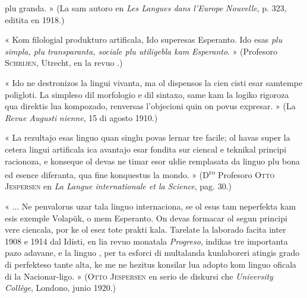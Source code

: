 \begin{VUpage}[237]{}
\vspace*{-9.0mm}
\VUpageSerre{8.26pt}{7.95pt}

\VUcontinue
plu granda. » (La sam autoro en \textit{Les Langues dans l'Europe}\nl
\textit{Nouvelle}, p. 323, editita en 1918.)

« Kom filologial produkturo artificala, Ido superesas Esperanto.\nl
Ido esas \textit{plu simpla, plu transparanta, sociale plu utiligebla kam}\nl
\textit{Esperanto}. » (Profesoro \textsc{Schrijen}, Utrecht, en la revuo .)\parplein

« Ido ne destronizos la lingui vivanta, ma ol dispensos la cien\cc
cisti esar samtempe poligloti. La simpleso dil morfologio e dil\nl
sintaxo, same kam la logiko rigoroza qua direktis lua kompozado,\nl
renversas l'objecioni quin on povus expresar. \cc
{} » (La \textit{Revue Augusti}\cc
\textit{nienne}, 15 di agosto 1910.)

« La rezultajo esas linguo quan singlu povas lernar tre facile; ol\nl
havas super la cetera lingui artificala ica avantajo esar fondita sur\nl
ciencal e teknikal principi racionoza, e konseque ol devas ne timar\nl
esor uldie remplasata da linguo plu bona ed esence diferanta, qua\nl
fine konquestus la mondo. » (D\textsuperscript{ro} Profesoro \textsc{Otto Jespersen} en\nl
\textit{La Langue internationale et la Science}, pag. 30.)

« ... Ne penvalorus uzar tala linguo internaciona, se ol esus tam\nl
neperfekta kam esis exemple Volapük, o mem Esperanto. On devas\nl
formacar ol segun principi vere ciencala, por ke ol esez tote prakti\cc
kala. Tarelate la laborado facita inter 1908 e 1914 dal Idisti, en\nl
lia revuo monatala \textit{Progreso}, indikas tre importanta pazo adavane,\nl
e la linguo , per ta esforci di multalanda kunlaboreri atingis\nl
grado di perfekteso tante alta, ke me ne hezitus konsilar lua adopto\nl
kom linguo oficala di la Nacionar-ligo. » (\textsc{Otto Jespersen} en serio\nl
de diskursi che \textit{University Collège}, Londono, junio 1920.)


\end{VUpage}
